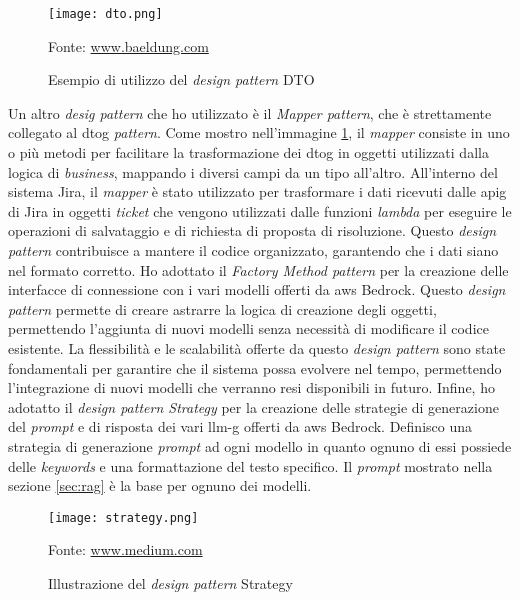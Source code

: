 \begin{figure}[H]
    \centering
    \texttt{[image: dto.png]}
    \caption{Esempio di utilizzo del \textit{design pattern} DTO}
    \small Fonte: \href{https://www.baeldung.com/java-dto-pattern} {www.baeldung.com}
    \label{fig:dto}
\end{figure}
\noindent
Un altro \textit{desig pattern} che ho utilizzato è il \textit{Mapper pattern}, che è strettamente collegato al \gls{dtog} \textit{pattern}.  Come mostro nell'immagine \ref{fig:dto}, il \textit{mapper} consiste in uno o più metodi per facilitare la trasformazione dei \gls{dtog} in oggetti utilizzati dalla logica di \textit{business}, mappando i diversi campi da un tipo all’altro. All'interno del sistema Jira, il \textit{mapper} è stato utilizzato per trasformare i dati ricevuti dalle \gls{apig} di Jira in oggetti \textit{ticket} che vengono utilizzati dalle funzioni \textit{lambda} per eseguire le operazioni di salvataggio e di richiesta di proposta di risoluzione.
Questo \textit{design pattern} contribuisce a mantere il codice organizzato, garantendo che i dati siano nel formato corretto. Ho adottato il \textit{Factory Method pattern} per la creazione delle interfacce di connessione con i vari modelli offerti da \gls{aws} Bedrock. Questo \textit{design pattern} permette di creare astrarre la logica di creazione degli oggetti, permettendo l'aggiunta di nuovi modelli senza necessità di modificare il codice esistente. La flessibilità e le scalabilità
offerte da questo \textit{design pattern} sono state fondamentali per garantire che il sistema possa evolvere nel tempo, permettendo l'integrazione di nuovi modelli che verranno resi disponibili in futuro. 
Infine, ho adotatto il \textit{design pattern Strategy} per la creazione delle strategie di generazione del \textit{prompt} e di risposta dei vari \gls{llm-g} offerti da \gls{aws} Bedrock. Definisco una strategia di generazione \textit{prompt} ad ogni modello in quanto ognuno di essi possiede delle \textit{keywords} e una formattazione del testo specifico. Il \textit{prompt} mostrato nella sezione \ref{sec:rag} è la base per ognuno dei modelli. 

\begin{figure}[H]
    \centering
    \texttt{[image: strategy.png]}
    \caption{Illustrazione del \textit{design pattern} Strategy}
    \small Fonte: \href{https://medium.com/litslink/design-patterns-strategy-in-examples-eae7bf10a817} {www.medium.com}
    \label{fig:strategy}
\end{figure}

